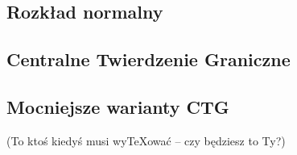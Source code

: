 {

\makeatletter
{}
\makeatother
\graphicspath{{../probabil}}

\let\realsection\section
\let\realsubsection\subsection
\let\section\subsection
\let\subsection\subsubsection
\let\subsubsection\paragraph

\realsubsection{Rozkład normalny}



\realsubsection{Centralne Twierdzenie Graniczne}


\realsubsection{Mocniejsze warianty CTG}
(To ktoś kiedyś musi wyTeXować -- czy będziesz to Ty?)
}



